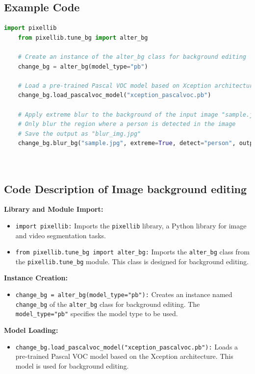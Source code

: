 \subsection{Example Code}
\begin{lstlisting}[language=Python]
    import pixellib
    from pixellib.tune_bg import alter_bg
    
    # Create an instance of the alter_bg class for background editing
    change_bg = alter_bg(model_type="pb")
    
    # Load a pre-trained Pascal VOC model based on Xception architecture
    change_bg.load_pascalvoc_model("xception_pascalvoc.pb")
    
    # Apply extreme blur to the background of the input image "sample.jpg"
    # Only blur the region where a person is detected in the image
    # Save the output as "blur_img.jpg"
    change_bg.blur_bg("sample.jpg", extreme=True, detect="person", output_image_name="blur_img.jpg")
    
    
\end{lstlisting}


\subsection*{Code Description of Image background editing}

\textbf{Library and Module Import:}
\begin{itemize}
    \item \texttt{import pixellib:} Imports the \texttt{pixellib} library, a Python library for image and video segmentation tasks.
    \item \texttt{from pixellib.tune\_bg import alter\_bg:} Imports the \texttt{alter\_bg} class from the \texttt{pixellib.tune\_bg} module. This class is designed for background editing.
\end{itemize}

\textbf{Instance Creation:}
\begin{itemize}
    \item \texttt{change\_bg = alter\_bg(model\_type="pb"):} Creates an instance named \texttt{change\_bg} of the \texttt{alter\_bg} class for background editing. The \texttt{model\_type="pb"} specifies the model type to be used.
\end{itemize}

\textbf{Model Loading:}
\begin{itemize}
    \item \texttt{change\_bg.load\_pascalvoc\_model("xception\_pascalvoc.pb"):} Loads a pre-trained Pascal VOC model based on the Xception architecture. This model is used for background editing.
\end{itemize}

